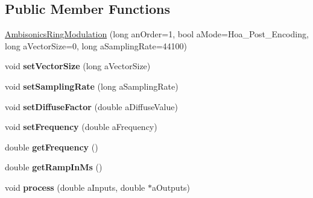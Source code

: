 \subsection*{Public Member Functions}
\begin{DoxyCompactItemize}
\item 
\hyperlink{class_ambisonics_ring_modulation_aacc4d01d890203fb04536567f7299674}{Ambisonics\-Ring\-Modulation} (long an\-Order=1, bool a\-Mode=Hoa\-\_\-\-Post\-\_\-\-Encoding, long a\-Vector\-Size=0, long a\-Sampling\-Rate=44100)
\item 
\hypertarget{class_ambisonics_ring_modulation_aa2d68261a3de0aa9489260a9c57e7e1d}{void {\bfseries set\-Vector\-Size} (long a\-Vector\-Size)}\label{class_ambisonics_ring_modulation_aa2d68261a3de0aa9489260a9c57e7e1d}

\item 
\hypertarget{class_ambisonics_ring_modulation_a594dfe3eeb5e8e09e3d9acf66fbab5ba}{void {\bfseries set\-Sampling\-Rate} (long a\-Sampling\-Rate)}\label{class_ambisonics_ring_modulation_a594dfe3eeb5e8e09e3d9acf66fbab5ba}

\item 
\hypertarget{class_ambisonics_ring_modulation_a013bf1ed1fd2f970308376d2a5e02d8e}{void {\bfseries set\-Diffuse\-Factor} (double a\-Diffuse\-Value)}\label{class_ambisonics_ring_modulation_a013bf1ed1fd2f970308376d2a5e02d8e}

\item 
\hypertarget{class_ambisonics_ring_modulation_ae716b5f51bc8bac8e8327578f25d24d8}{void {\bfseries set\-Frequency} (double a\-Frequency)}\label{class_ambisonics_ring_modulation_ae716b5f51bc8bac8e8327578f25d24d8}

\item 
\hypertarget{class_ambisonics_ring_modulation_a90449f8baa8e6514da308d9d714732d5}{double {\bfseries get\-Frequency} ()}\label{class_ambisonics_ring_modulation_a90449f8baa8e6514da308d9d714732d5}

\item 
\hypertarget{class_ambisonics_ring_modulation_aaad5939d53cddec5503c73a6e8b3aae6}{double {\bfseries get\-Ramp\-In\-Ms} ()}\label{class_ambisonics_ring_modulation_aaad5939d53cddec5503c73a6e8b3aae6}

\item 
\hypertarget{class_ambisonics_ring_modulation_aa329cfb6c215187477f04797b0048b6c}{void {\bfseries process} (double a\-Inputs, double $\ast$a\-Outputs)}\label{class_ambisonics_ring_modulation_aa329cfb6c215187477f04797b0048b6c}


\end{DoxyCompactItemize}
